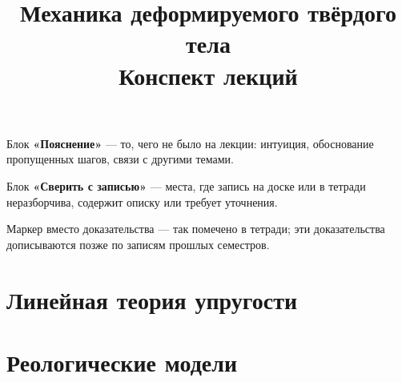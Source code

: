 \documentclass[12pt,a4paper]{article}
\title{\textbf{Механика деформируемого твёрдого тела}\\[0.3em]\large Конспект лекций}
\author{}
\date{}
\begin{document}
\maketitle
\thispagestyle{empty}

\begin{idea}[title={Обозначения в конспекте}]
Блок \textbf{«Пояснение»} — то, чего не было на лекции: интуиция, обоснование
пропущенных шагов, связи с другими темами.

\medskip
Блок \textbf{«Сверить с записью»} — места, где запись на доске или в тетради
неразборчива, содержит описку или требует уточнения.

\medskip
Маркер \plusplus{} вместо доказательства — так помечено в тетради; эти доказательства
дописываются позже по записям прошлых семестров.
\end{idea}

\tableofcontents
\newpage

\renewcommand{\thesubsection}{\S\arabic{subsection}}

\section{Линейная теория упругости}


\newpage


\newpage
\section{Реологические модели}


\newpage


\newpage


\newpage


\newpage


\newpage

\end{document}
